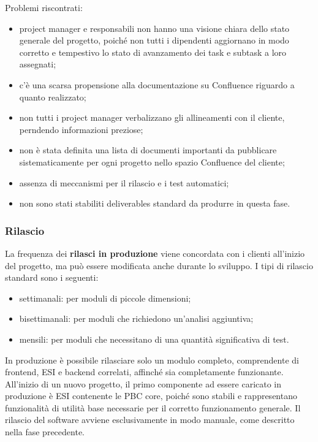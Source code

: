         Problemi riscontrati:
        \begin{itemize}
            \item project manager e responsabili non hanno una visione chiara dello stato generale del progetto, poiché non tutti i dipendenti aggiornano in modo corretto e tempestivo
            lo stato di avanzamento dei task e subtask a loro assegnati;
            \item c'è una scarsa propensione alla documentazione su Confluence riguardo a quanto realizzato;            
            \item non tutti i project manager verbalizzano gli allineamenti con il cliente, perndendo informazioni preziose;
            \item non è stata definita una lista di documenti importanti da pubblicare sistematicamente per ogni progetto nello spazio Confluence del cliente;
            \item assenza di meccanismi per il rilascio e i test automatici;
            \item non sono stati stabiliti deliverables standard da produrre in questa fase.
        \end{itemize}

        \subsubsection{Rilascio}
        La frequenza dei \textbf{rilasci in produzione} viene concordata con i clienti all'inizio del progetto, ma può essere modificata anche durante lo sviluppo.
        I tipi di rilascio standard sono i seguenti:
        \begin{itemize}
            \item settimanali: per moduli di piccole dimensioni;
            \item bisettimanali: per moduli che richiedono un'analisi aggiuntiva;
            \item mensili: per moduli che necessitano di una quantità significativa di test.
        \end{itemize}  
        
        In produzione è possibile rilasciare solo un modulo completo, comprendente di frontend, \ac{ESI} e backend correlati, affinché sia completamente funzionante.
        All'inizio di un nuovo progetto, il primo componente ad essere caricato in produzione è \ac{ESI} contenente le \ac{PBC} core, poiché sono stabili e rappresentano
        funzionalità di utilità base necessarie per il corretto funzionamento generale.
        Il rilascio del software avviene esclusivamente in modo manuale, come descritto nella fase precedente.
        
